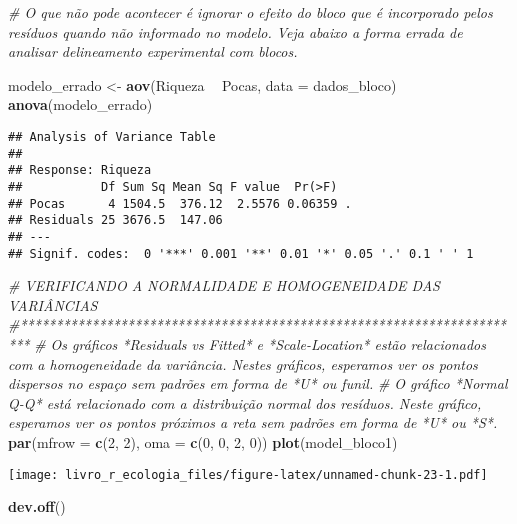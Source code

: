 \documentclass[
]{book}
\newenvironment{Shaded}{\begin{snugshade}}{\end{snugshade}}
\newcommand{\CommentTok}[1]{\textcolor[rgb]{0.56,0.35,0.01}{\textit{#1}}}
\newcommand{\DataTypeTok}[1]{\textcolor[rgb]{0.13,0.29,0.53}{#1}}
\newcommand{\DecValTok}[1]{\textcolor[rgb]{0.00,0.00,0.81}{#1}}
\newcommand{\KeywordTok}[1]{\textcolor[rgb]{0.13,0.29,0.53}{\textbf{#1}}}
\newcommand{\NormalTok}[1]{#1}
\newcommand{\OperatorTok}[1]{\textcolor[rgb]{0.81,0.36,0.00}{\textbf{#1}}}
\newcommand{\StringTok}[1]{\textcolor[rgb]{0.31,0.60,0.02}{#1}}
\begin{document}
\begin{Shaded}
\begin{Highlighting}[]
\CommentTok{# O que não pode acontecer é ignorar o efeito do bloco que é incorporado pelos resíduos quando não informado no modelo. Veja abaixo a forma errada de analisar delineamento experimental com blocos.}

\NormalTok{modelo_errado <-}\StringTok{ }\KeywordTok{aov}\NormalTok{(Riqueza }\OperatorTok{~}\StringTok{ }\NormalTok{Pocas, }\DataTypeTok{data =}\NormalTok{ dados_bloco)}
\KeywordTok{anova}\NormalTok{(modelo_errado)}
\end{Highlighting}
\end{Shaded}

\begin{verbatim}
## Analysis of Variance Table
## 
## Response: Riqueza
##           Df Sum Sq Mean Sq F value  Pr(>F)  
## Pocas      4 1504.5  376.12  2.5576 0.06359 .
## Residuals 25 3676.5  147.06                  
## ---
## Signif. codes:  0 '***' 0.001 '**' 0.01 '*' 0.05 '.' 0.1 ' ' 1
\end{verbatim}

\begin{Shaded}
\begin{Highlighting}[]
\CommentTok{# VERIFICANDO A NORMALIDADE E HOMOGENEIDADE DAS VARIÂNCIAS}
\CommentTok{#***********************************************************************}
\CommentTok{# Os gráficos *Residuals vs Fitted* e *Scale-Location* estão relacionados com a homogeneidade da variância. Nestes gráficos, esperamos ver os pontos dispersos no espaço sem padrões em forma de *U* ou funil. }
\CommentTok{# O gráfico *Normal Q-Q* está relacionado com a distribuição normal dos resíduos. Neste gráfico, esperamos ver os pontos próximos a reta sem padrões em forma de *U* ou *S*. }
\KeywordTok{par}\NormalTok{(}\DataTypeTok{mfrow =} \KeywordTok{c}\NormalTok{(}\DecValTok{2}\NormalTok{, }\DecValTok{2}\NormalTok{), }\DataTypeTok{oma =} \KeywordTok{c}\NormalTok{(}\DecValTok{0}\NormalTok{, }\DecValTok{0}\NormalTok{, }\DecValTok{2}\NormalTok{, }\DecValTok{0}\NormalTok{))}
\KeywordTok{plot}\NormalTok{(model_bloco1)}
\end{Highlighting}
\end{Shaded}

\texttt{[image: livro\_r\_ecologia\_files/figure-latex/unnamed-chunk-23-1.pdf]}

\begin{Shaded}
\begin{Highlighting}[]
\KeywordTok{dev.off}\NormalTok{()}
\end{Highlighting}
\end{Shaded}
\end{document}
